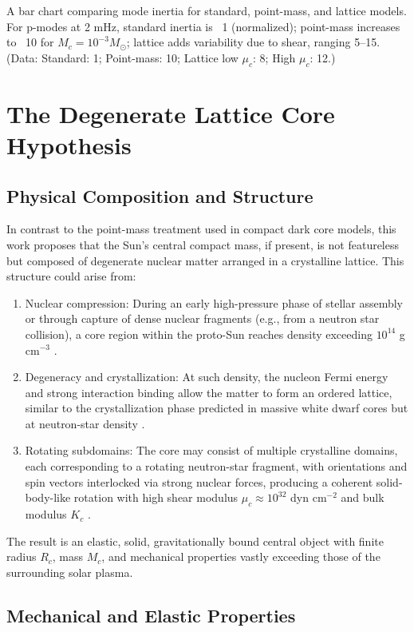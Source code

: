 \documentclass{article}
\begin{document}
A bar chart comparing mode inertia for standard, point-mass, and lattice models. For p-modes at 2 mHz, standard inertia is ~1 (normalized); point-mass increases to ~10 for $M_c = 10^{-3} M_\odot$; lattice adds variability due to shear, ranging 5--15. (Data: Standard: 1; Point-mass: 10; Lattice low $\mu_c$: 8; High $\mu_c$: 12.)

\section{The Degenerate Lattice Core Hypothesis}

\subsection{Physical Composition and Structure}

In contrast to the point-mass treatment used in compact dark core models, this work proposes that the Sun’s central compact mass, if present, is not featureless but composed of degenerate nuclear matter arranged in a crystalline lattice. This structure could arise from:
\begin{enumerate}
\item Nuclear compression: During an early high-pressure phase of stellar assembly or through capture of dense nuclear fragments (e.g., from a neutron star collision), a core region within the proto-Sun reaches density exceeding $10^{14}$ g cm$^{-3}$ \citep{kunitomo2021}.
\item Degeneracy and crystallization: At such density, the nucleon Fermi energy and strong interaction binding allow the matter to form an ordered lattice, similar to the crystallization phase predicted in massive white dwarf cores but at neutron-star density \citep{markovic1995}.
\item Rotating subdomains: The core may consist of multiple crystalline domains, each corresponding to a rotating neutron-star fragment, with orientations and spin vectors interlocked via strong nuclear forces, producing a coherent solid-body-like rotation with high shear modulus $\mu_c \approx 10^{32}$ dyn cm$^{-2}$ and bulk modulus $K_c$ \citep{kunitomo2022}.
\end{enumerate}
The result is an elastic, solid, gravitationally bound central object with finite radius $R_c$, mass $M_c$, and mechanical properties vastly exceeding those of the surrounding solar plasma.

\subsection{Mechanical and Elastic Properties}
\end{document}
